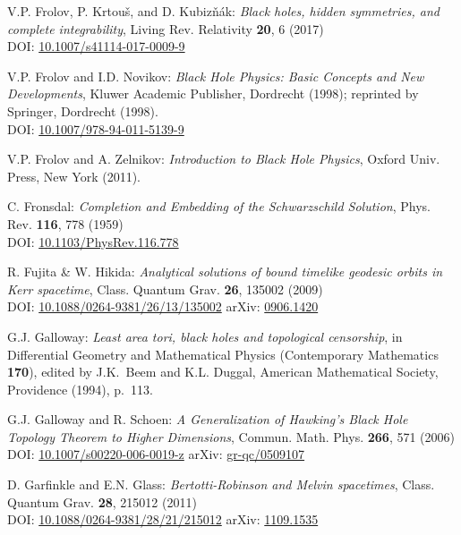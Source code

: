 \begin{thebibliography}{123}
V.P. Frolov, P. Krtouš, and D. Kubizňák:
{\em Black holes, hidden symmetries, and complete integrability},
Living Rev. Relativity {\bf 20}, 6 (2017) \\
DOI: \href{https://doi.org/10.1007/s41114-017-0009-9}{10.1007/s41114-017-0009-9}

V.P. Frolov and I.D. Novikov: {\em Black Hole Physics:
Basic Concepts and New Developments},
Kluwer Academic Publisher, Dordrecht (1998); reprinted by
Springer, Dordrecht (1998). \\
DOI: \href{https://doi.org/10.1007/978-94-011-5139-9}{10.1007/978-94-011-5139-9}

V.P. Frolov and A. Zelnikov: {\em Introduction to Black Hole Physics},
Oxford Univ. Press, New York (2011).

C. Fronsdal: {\em Completion and Embedding of the Schwarzschild Solution},
Phys. Rev. {\bf 116}, 778 (1959) \\
DOI: \href{https://doi.org/10.1103/PhysRev.116.778}{10.1103/PhysRev.116.778}

R. Fujita \& W. Hikida:
{\em Analytical solutions of bound timelike geodesic orbits in Kerr spacetime},
Class. Quantum Grav. {\bf 26}, 135002 (2009) \\
DOI: \href{https://doi.org/10.1088/0264-9381/26/13/135002}{10.1088/0264-9381/26/13/135002}\hfill
arXiv: \href{https://arxiv.org/abs/0906.1420}{0906.1420}

G.J. Galloway:
{\em Least area tori, black holes and topological censorship},
in {\rm Differential Geometry and Mathematical Physics}
(Contemporary Mathematics {\bf 170}),
edited by  J.K.~Beem and K.L. Duggal,
American Mathematical Society, Providence (1994), p.~113.

G.J. Galloway and R. Schoen:
{\em A Generalization of Hawking’s Black Hole Topology Theorem to Higher Dimensions},
Commun. Math. Phys. {\bf 266}, 571 (2006)\\
DOI: \href{https://doi.org/10.1007/s00220-006-0019-z}{10.1007/s00220-006-0019-z}\hfill
arXiv: \href{https://arxiv.org/abs/gr-qc/0509107}{gr-qc/0509107}

D. Garfinkle and E.N. Glass:
{\em Bertotti-Robinson and Melvin spacetimes},
Class. Quantum Grav. {\bf 28}, 215012 (2011)\\
DOI: \href{https://doi.org/10.1088/0264-9381/28/21/215012}{10.1088/0264-9381/28/21/215012}\hfill
arXiv: \href{https://arxiv.org/abs/1109.1535}{1109.1535}


\end{thebibliography}
